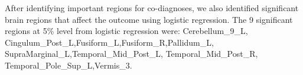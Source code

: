 \documentclass[9pt]{article}
\begin{document}
After identifying important regions for co-diagnoses, we also identified  significant brain regions that affect the outcome using logistic regression. The 9 significant regions at 5\% level from logistic regression were: Cerebellum\_9\_L, Cingulum\_Post\_L,Fusiform\_L,Fusiform\_R,Pallidum\_L, SupraMarginal\_L,Temporal\_Mid\_Post\_L, Temporal\_Mid\_Post\_R, Temporal\_Pole\_Sup\_L,Vermis\_3.
\end{document}
